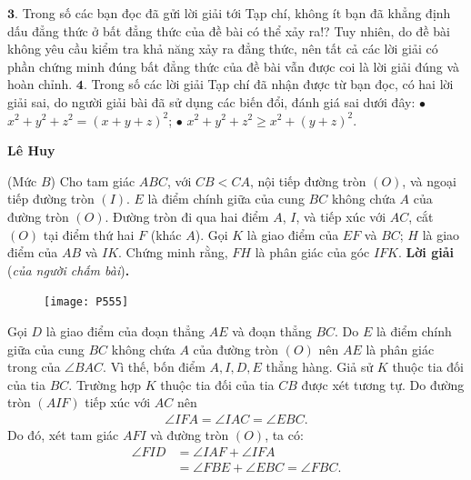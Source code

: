 \begin{multicols}{2}
	\vskip 0.05cm
	$\pmb{3.}$ Trong số các bạn đọc đã gửi lời giải tới Tạp chí, không ít bạn đã khẳng định dấu đẳng thức ở bất đẳng thức của đề bài có thể xảy ra!? Tuy nhiên, do đề bài không yêu cầu kiểm tra khả năng xảy ra đẳng thức, nên tất cả các lời giải có phần chứng minh đúng bất đẳng thức của đề bài vẫn được coi là lời giải đúng và hoàn chỉnh.
	\vskip 0.05cm
	$\pmb{4.}$ Trong số các lời giải Tạp chí đã nhận được từ bạn đọc, có hai lời giải sai, do người giải bài đã sử dụng các biến đổi, đánh giá sai dưới đây:
	\vskip 0.05cm
	$\bullet$ ${x^2} + {y^2} + {z^2} = {\left( {x + y + z} \right)^2}$;
	\vskip 0.05cm
	$\bullet$ ${x^2} + {y^2} + {z^2} \ge {x^2} + {\left( {y + z} \right)^2}$.
	\begin{flushright}
		\textbf{\color{thachthuctoanhoc}Lê Huy}
	\end{flushright}
	{}
	(Mức $B$) Cho tam giác $ABC$, với $CB < CA$, nội tiếp đường tròn $(O)$, và ngoại tiếp đường tròn $(I)$. $E$ là điểm chính giữa của cung $BC$ không chứa $A$ của đường tròn $(O)$. Đường tròn đi qua hai điểm $A$, $I$, và tiếp xúc với $AC$, cắt $(O)$ tại điểm thứ hai $F$ (khác $A$). Gọi $K$ là giao điểm của $EF$ và $BC$; $H$ là giao điểm của $AB$ và $IK$. Chứng minh rằng, $FH$ là phân giác của góc $IFK$.
	\vskip 0.05cm
	\textbf{\color{thachthuctoanhoc}Lời giải} (\textit{của người chấm bài})\textbf{\color{thachthuctoanhoc}.}
		\begin{figure}[H]
		\vspace*{-5pt}
		\centering
		\captionsetup{labelformat= empty, justification=centering}
		\texttt{[image: P555]}
		\vspace*{-10pt}
	\end{figure}
	Gọi $D$ là giao điểm của đoạn thẳng $AE$ và đoạn thẳng $BC$. Do $E$ là điểm chính giữa của cung $BC$ không chứa $A$ của đường tròn $(O)$ nên $AE$ là phân giác trong của $\angle BAC$.  Vì thế, bốn điểm $A, I, D, E$ thẳng hàng.
	\vskip 0.05cm
	Giả sử $K$ thuộc tia đối của tia $BC$. Trường hợp $K$ thuộc tia đối của tia $CB$ được xét tương tự.
	\vskip 0.05cm
	Do đường tròn $(AIF)$ tiếp xúc với $AC$ nên
	\begin{align*}
		\angle IFA = \angle IAC = \angle EBC. \tag{$1$}
	\end{align*}
	Do đó, xét tam giác $AFI$ và đường tròn $(O)$, ta có:
	\begin{align*}
		\angle FID &= \angle IAF + \angle IFA \\
		&= \angle FBE + \angle EBC = \angle FBC.
	\end{align*}

\end{multicols}
